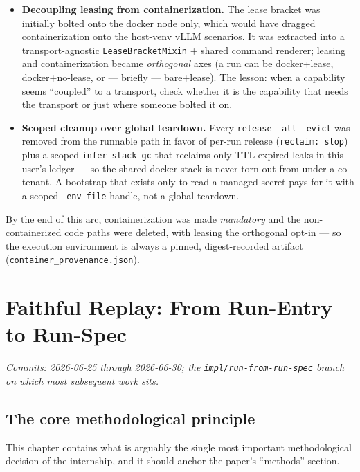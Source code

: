 \documentclass[11pt]{report}
\newcommand{\code}[1]{\texttt{#1}}
\begin{document}
\begin{itemize}[nosep]
  \item \textbf{Decoupling leasing from containerization.} The lease bracket was
        initially bolted onto the docker node only, which would have dragged
        containerization onto the host-venv vLLM scenarios. It was extracted into a
        transport-agnostic \code{LeaseBracketMixin} + shared command renderer;
        leasing and containerization became \emph{orthogonal} axes (a run can be
        docker+lease, docker+no-lease, or --- briefly --- bare+lease). The lesson:
        when a capability seems ``coupled'' to a transport, check whether it is the
        capability that needs the transport or just where someone bolted it on.
  \item \textbf{Scoped cleanup over global teardown.} Every \code{release --all
        --evict} was removed from the runnable path in favor of per-run release
        (\code{reclaim: stop}) plus a scoped \code{infer-stack gc} that reclaims
        only TTL-expired leaks in this user's ledger --- so the shared docker stack
        is never torn out from under a co-tenant. A bootstrap that exists only to
        read a managed secret pays for it with a scoped \code{--env-file} handle,
        not a global teardown.
\end{itemize}

By the end of this arc, containerization was made \emph{mandatory} and the
non-containerized code paths were deleted, with leasing the orthogonal opt-in ---
so the execution environment is always a pinned, digest-recorded artifact
(\code{container\_provenance.json}).

\chapter{Faithful Replay: From Run-Entry to Run-Spec}
\label{chap:fromspec}

\emph{Commits: 2026-06-25 through 2026-06-30; the \code{impl/run-from-run-spec}
branch on which most subsequent work sits.}

\section{The core methodological principle}

This chapter contains what is arguably the single most important methodological
decision of the internship, and it should anchor the paper's ``methods'' section.
\end{document}
